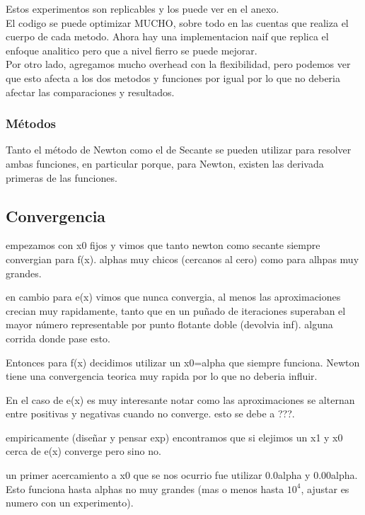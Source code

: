 Estos experimentos son replicables y los puede ver en el anexo.\\

El codigo se puede optimizar MUCHO, sobre todo en las cuentas que realiza el
cuerpo de cada metodo. Ahora hay una implementacion naif que replica el enfoque
analitico pero que a nivel fierro se puede mejorar.\\

Por otro lado, agregamos mucho overhead con la flexibilidad, pero podemos ver
que esto afecta a los dos metodos y funciones por igual por lo que no deberia
afectar las comparaciones y resultados.

\subsubsection{Métodos}
Tanto el método de Newton como el de Secante se pueden utilizar para resolver ambas funciones,
en particular porque, para Newton, existen las derivada primeras de las funciones.



\subsection{Convergencia}

empezamos con x0 fijos y vimos que tanto newton como secante siempre convergian
para f(x). %
alphas muy chicos (cercanos al cero) como para alhpas muy grandes.

en cambio para e(x) vimos que nunca convergia, al menos las aproximaciones
crecian muy rapidamente, tanto que en un puñado de iteraciones superaban el
mayor número representable por punto flotante doble (devolvia inf). %
alguna corrida donde pase esto.

Entonces para f(x) decidimos utilizar un x0=alpha que siempre funciona. Newton
tiene una convergencia teorica muy rapida por lo que no deberia influir.

En el caso de e(x) es muy interesante notar como las aproximaciones se alternan
entre positivas y negativas cuando no converge. esto se debe a ???.


empiricamente (diseñar y pensar exp) encontramos que si elejimos un x1 y x0
cerca de e(x) converge pero sino no.

un primer acercamiento a x0 que se nos ocurrio fue utilizar 0.0alpha y
0.00alpha. Esto funciona hasta alphas no muy grandes (mas o menos hasta $10^4$,
ajustar es numero con un experimento).

